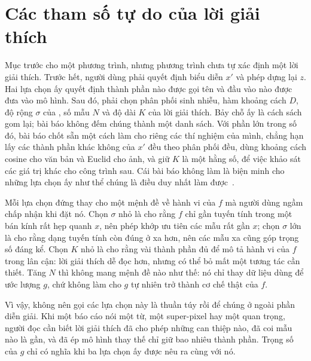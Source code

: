 \section{Các tham số tự do của lời giải thích}
\label{sec:ch03-cac-tham-so-tu-do}

%
Mục trước cho một phương trình, nhưng phương trình chưa tự xác định một lời
giải thích. Trước hết, người dùng phải quyết định biểu diễn $x'$ và phép dựng lại
$z$. Hai lựa chọn ấy quyết định thành phần nào được gọi tên và đầu vào nào
được đưa vào mô hình. Sau đó, phải chọn phân phối sinh nhiễu, hàm khoảng cách
$D$, độ rộng $\sigma$ của , số mẫu $N$ và độ dài $K$ của
lời giải thích. Bảy chỗ ấy là cách sách gom lại; bài báo không đếm chúng thành
một danh sách. Với phần lớn trong số đó, bài báo chốt sẵn một cách làm cho
riêng các thí nghiệm của mình, chẳng hạn lấy các thành phần khác không của $x'$
đều theo phân phối đều, dùng khoảng cách cosine cho văn bản và Euclid cho ảnh,
và giữ $K$ là một hằng số, để việc khảo sát các giá trị khác cho công trình sau.
Cái bài báo không làm là biện minh cho những lựa chọn ấy như thể chúng là điều
duy nhất làm được~\autocite{p09lime}.

Mỗi lựa chọn đứng thay cho một mệnh đề về hành vi của $f$ mà người dùng ngầm
chấp nhận khi đặt nó. Chọn $\sigma$ nhỏ là cho rằng $f$ chỉ gần tuyến tính
trong một bán kính rất hẹp quanh $x$, nên phép khớp ưu tiên các mẫu rất gần
$x$; chọn $\sigma$ lớn là cho rằng dạng tuyến tính còn đúng ở xa hơn, nên các
mẫu xa cũng góp trọng số đáng kể. Chọn $K$ nhỏ là cho rằng vài thành phần đủ
để mô tả hành vi của $f$ trong lân cận: lời giải thích dễ đọc hơn, nhưng có thể
bỏ mất một tương tác cần thiết. Tăng $N$ thì không mang mệnh đề nào như thế:
nó chỉ thay dữ liệu dùng để ước lượng $g$, chứ không làm cho $g$ tự nhiên trở
thành cơ chế thật của $f$.

Vì vậy, không nên gọi các lựa chọn này là 
thuần túy rồi để chúng ở ngoài phần diễn giải. Khi một báo cáo nói một từ, một super-pixel hay một
 quan trọng, người đọc cần biết lời giải thích đã cho phép những can
thiệp nào, đã coi mẫu nào là gần, và đã ép mô hình thay thế chỉ giữ bao nhiêu
thành phần. Trọng số của $g$ chỉ có nghĩa khi ba lựa chọn ấy được nêu ra cùng
với nó.

